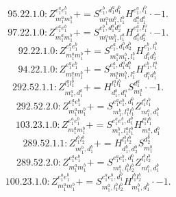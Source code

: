 \documentclass[letterpaper,10pt,fleqn,leqno,onecolumn]{article}
\begin{document}
\begin{equation} \;\;\;\;\;\;  95.22.1.0: Z^{e_{1}^{a}e_{1}^{b}}_{m_{1}^{a}m_{1}^{b}}+=S^{e_{1}^{b},d_{1}^{a}d_{1}^{b}}_{m_{1}^{a}m_{1}^{b},l_{1}^{b}}H^{e_{1}^{a},l_{1}^{b}}_{d_{1}^{a}d_{1}^{b}}\cdot -1. \end{equation}
\begin{equation} \;\;\;\;\;\;  97.22.1.0: Z^{e_{1}^{a}e_{1}^{b}}_{m_{1}^{a}m_{1}^{b}}+=S^{e_{1}^{b},d_{1}^{a}d_{2}^{a}}_{m_{1}^{a}m_{1}^{b},l_{1}^{a}}H^{e_{1}^{a},l_{1}^{a}}_{d_{1}^{a}d_{2}^{a}}\cdot -1. \end{equation}
\begin{equation} \;\;\;\;\;\;  92.22.1.0: Z^{e_{1}^{a}e_{1}^{b}}_{m_{1}^{a}m_{1}^{b}}+=S^{e_{1}^{a},d_{1}^{b}d_{2}^{b}}_{m_{1}^{a}m_{1}^{b},l_{1}^{b}}H^{e_{1}^{b},l_{1}^{b}}_{d_{1}^{b}d_{2}^{b}} \end{equation}
\begin{equation} \;\;\;\;\;\;  94.22.1.0: Z^{e_{1}^{a}e_{1}^{b}}_{m_{1}^{a}m_{1}^{b}}+=S^{e_{1}^{a},d_{1}^{a}d_{1}^{b}}_{m_{1}^{a}m_{1}^{b},l_{1}^{a}}H^{e_{1}^{b},l_{1}^{a}}_{d_{1}^{a}d_{1}^{b}} \end{equation}
\begin{equation} \;\;\;\;\;\;  292.52.1.1: Z^{l_{1}^{a}l_{1}^{b}}_{m_{1}^{a},d_{1}^{b}}+=H^{l_{1}^{a}l_{1}^{b}}_{d_{1}^{b},d_{1}^{a}}S^{d_{1}^{a}}_{m_{1}^{a}}\cdot -1. \end{equation}
\begin{equation} \;\;\;\;\;\;  292.52.2.0: Z^{e_{1}^{a}e_{1}^{b}}_{m_{1}^{a}m_{1}^{b}}+=S^{e_{1}^{a}e_{1}^{b},d_{1}^{b}}_{m_{1}^{b},l_{1}^{a}l_{1}^{b}}Z^{l_{1}^{a}l_{1}^{b}}_{m_{1}^{a},d_{1}^{b}} \end{equation}
\begin{equation} \;\;\;\;\;\;  103.23.1.0: Z^{e_{1}^{a}e_{1}^{b}}_{m_{1}^{a}m_{1}^{b}}+=S^{e_{1}^{a}e_{1}^{b},d_{1}^{b}}_{m_{1}^{b},l_{1}^{a}l_{1}^{b}}H^{l_{1}^{a}l_{1}^{b}}_{m_{1}^{a},d_{1}^{b}} \end{equation}
\begin{equation} \;\;\;\;\;\;  289.52.1.1: Z^{l_{1}^{b}l_{2}^{b}}_{m_{1}^{b},d_{1}^{b}}+=H^{l_{1}^{b}l_{2}^{b}}_{d_{1}^{b},d_{2}^{b}}S^{d_{2}^{b}}_{m_{1}^{b}} \end{equation}
\begin{equation} \;\;\;\;\;\;  289.52.2.0: Z^{e_{1}^{a}e_{1}^{b}}_{m_{1}^{a}m_{1}^{b}}+=S^{e_{1}^{a}e_{1}^{b},d_{1}^{b}}_{m_{1}^{a},l_{1}^{b}l_{2}^{b}}Z^{l_{1}^{b}l_{2}^{b}}_{m_{1}^{b},d_{1}^{b}} \end{equation}
\begin{equation} \;\;\;\;\;\;  100.23.1.0: Z^{e_{1}^{a}e_{1}^{b}}_{m_{1}^{a}m_{1}^{b}}+=S^{e_{1}^{a}e_{1}^{b},d_{1}^{b}}_{m_{1}^{a},l_{1}^{b}l_{2}^{b}}H^{l_{1}^{b}l_{2}^{b}}_{m_{1}^{b},d_{1}^{b}}\cdot -1. \end{equation}
\end{document}
